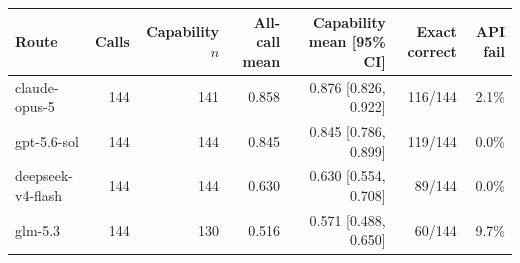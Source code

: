 \begin{tabular}{lrrrrrr}
\toprule
Route & Calls & Capability $n$ & All-call mean & Capability mean [95\% CI] & Exact correct & API fail \\
\midrule
claude-opus-5 & 144 & 141 & 0.858 & 0.876 [0.826, 0.922] & 116/144 & 2.1\% \\
gpt-5.6-sol & 144 & 144 & 0.845 & 0.845 [0.786, 0.899] & 119/144 & 0.0\% \\
deepseek-v4-flash & 144 & 144 & 0.630 & 0.630 [0.554, 0.708] & 89/144 & 0.0\% \\
glm-5.3 & 144 & 130 & 0.516 & 0.571 [0.488, 0.650] & 60/144 & 9.7\% \\
\bottomrule
\end{tabular}

